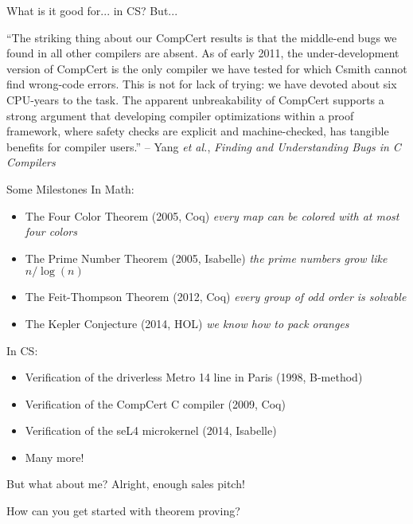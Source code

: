 \documentclass{beamer}
\begin{document}
\begin{frame}{What is it good for... in CS?}
  But...
  \begin{center}
    ``The striking thing about our CompCert results is that the
    middle-end bugs we found in all other compilers are absent. As of
    early 2011, the under-development version of CompCert is the only
    compiler we have tested for which Csmith cannot find
    wrong-code errors. This is not for lack of trying: we have devoted
    about six CPU-years to the task. The apparent unbreakability of
    CompCert supports a strong argument that developing compiler
    optimizations within a proof framework, where safety checks are
    explicit and machine-checked, has tangible benefits for compiler
    users.'' -- Yang {\it et al.}, {\it Finding and Understanding Bugs
      in C Compilers}
  \end{center}
\end{frame}

\begin{frame}{Some Milestones}
  In Math:
  \begin{itemize}
  \item The Four Color Theorem (2005, Coq) \emph{every map can be colored with at most four colors}
  \item The Prime Number Theorem (2005, Isabelle) \emph{the prime numbers grow like $n/\log(n)$}
  \item The Feit-Thompson Theorem (2012, Coq) \emph{every group of odd order is solvable}
  \item The Kepler Conjecture (2014, HOL) \emph{we know how to pack oranges}
  \end{itemize}
  In CS:
  \begin{itemize}
  \item Verification of the driverless Metro 14 line in Paris (1998, B-method)
  \item Verification of the CompCert C compiler (2009, Coq)
  \item Verification of the seL4 microkernel (2014, Isabelle)
  \item Many more!
  \end{itemize}
\end{frame}

\begin{frame}{But what about me?}
  Alright, enough sales pitch!\bigskip

  How can you get started with theorem proving?
\end{frame}
\end{document}

